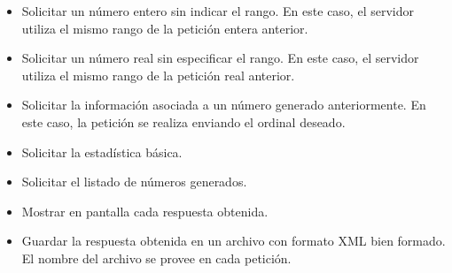 \documentclass[a4paper,12pt]{article}
\begin{document}
\begin{itemize}
\begin{itemize}
        \item Solicitar un número entero sin indicar el rango. En este caso, el servidor utiliza el mismo rango de la petición entera anterior.
        \item Solicitar un número real sin especificar el rango. En este caso, el servidor utiliza el mismo rango de la petición real anterior.
        \item Solicitar la información asociada a un número generado anteriormente. En este caso, la petición se realiza enviando el ordinal deseado.
        \item Solicitar la estadística básica.
        \item Solicitar el listado de números generados.
        \item Mostrar en pantalla cada respuesta obtenida.
        \item Guardar la respuesta obtenida en un archivo con formato XML bien formado. El nombre del archivo se provee en cada petición.
    \end{itemize}
\end{itemize}
\end{document}
